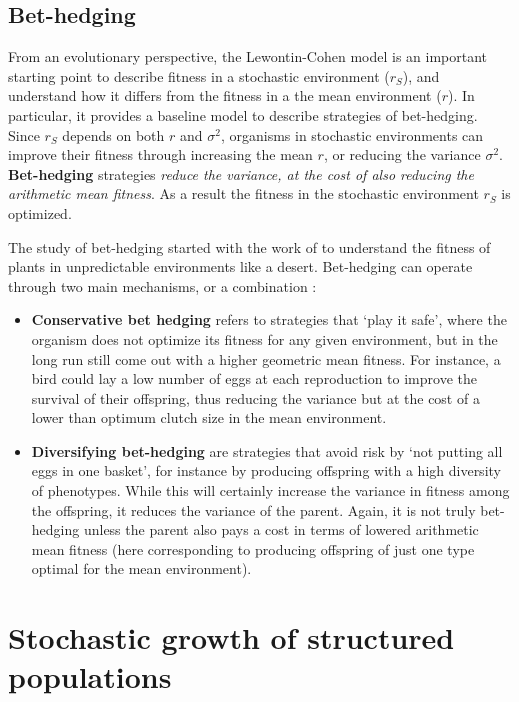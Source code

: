 \documentclass[
]{book}
\begin{document}
\hypertarget{bet-hedging}{%
\subsection{Bet-hedging}\label{bet-hedging}}

From an evolutionary perspective, the Lewontin-Cohen model is an important starting point to describe fitness in a stochastic environment (\(r_S\)), and understand how it differs from the fitness in a the mean environment (\(r\)). In particular, it provides a baseline model to describe strategies of bet-hedging. Since \(r_S\) depends on both \(r\) and \(\sigma^2\), organisms in stochastic environments can improve their fitness through increasing the mean \(r\), or reducing the variance \(\sigma^2\). \textbf{Bet-hedging} strategies \emph{reduce the variance, at the cost of also reducing the arithmetic mean fitness}. As a result the fitness in the stochastic environment \(r_S\) is optimized.

The study of bet-hedging started with the work of \citet{Cohen7} to understand the fitness of plants in unpredictable environments like a desert. Bet-hedging can operate through two main mechanisms, or a combination \citep{Starrfelt1}:

\begin{itemize}
\item
  \textbf{Conservative bet hedging} refers to strategies that `play it safe', where the organism does not optimize its fitness for any given environment, but in the long run still come out with a higher geometric mean fitness. For instance, a bird could lay a low number of eggs at each reproduction to improve the survival of their offspring, thus reducing the variance but at the cost of a lower than optimum clutch size in the mean environment.
\item
  \textbf{Diversifying bet-hedging} are strategies that avoid risk by `not putting all eggs in one basket', for instance by producing offspring with a high diversity of phenotypes. While this will certainly increase the variance in fitness among the offspring, it reduces the variance of the parent. Again, it is not truly bet-hedging unless the parent also pays a cost in terms of lowered arithmetic mean fitness (here corresponding to producing offspring of just one type optimal for the mean environment).
\end{itemize}

\hypertarget{stochastic-growth-of-structured-populations}{%
\section{Stochastic growth of structured populations}\label{stochastic-growth-of-structured-populations}}
\end{document}
